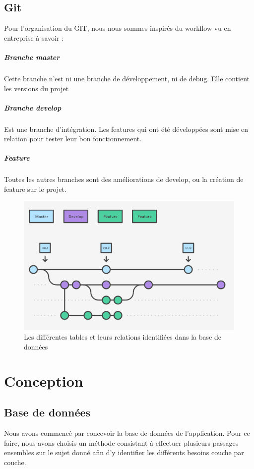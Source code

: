 \documentclass[french,12pt,a4paper,titlepage]{report}
\begin{document}
	\section{Git}
	Pour l'organisation du GIT, nous nous sommes inspirés du workflow vu en entreprise à savoir : 
	\paragraph{Branche master}
	Cette branche n'est ni une branche de développement, ni de debug. Elle contient les versions du projet
	\paragraph{Branche develop}
	Est une branche d'intégration. Les features qui ont été développées sont mise en relation pour tester leur bon fonctionnement.
	\paragraph{Feature}
	Toutes les autres branches sont des améliorations de develop, ou la création de feature sur le projet.
	\begin{figure}[ht]
		\centering
		\includegraphics[width=1\linewidth]{rapports_assets/git_flow.png}
		\caption{Les différentes tables et leurs relations identifiées dans la base de données}
	\end{figure}
	\chapter{Conception}
		\section{Base de données}
		Nous avons commencé par concevoir la base de données de l'application.
		\newline
		Pour ce faire, nous avons choisis un méthode consistant à effectuer plusieurs passages ensembles sur le sujet donné afin d'y identifier les différents besoins couche par couche.
\end{document}
